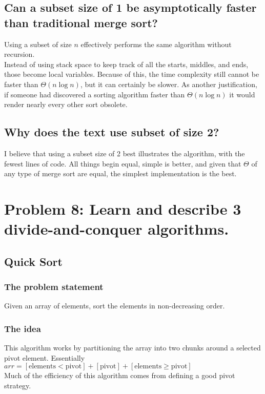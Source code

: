 \documentclass{article}
\begin{document}
    \subsection{Can a subset size of 1 be asymptotically faster than traditional merge sort?}
        Using a subset of size \(n\) effectively performs the same algorithm without recursion. \\
        Instead of using stack space to keep track of all the starts, middles, and ends, those become local variables.
        Because of this, the time complexity still cannot be faster than \(\Theta(n \log n)\), but it can certainly be slower.
        As another justification, if someone had discovered a sorting algorithm faster than \(\Theta(n \log n)\) it would render nearly every other sort obsolete.
    \subsection{Why does the text use subset of size 2?}
        I believe that using a subset size of 2 best illustrates the algorithm, with the fewest lines of code.
        All things begin equal, simple is better, and given that \(\Theta\) of any type of merge sort are equal,
        the simplest implementation is the best.

\section{Problem 8: Learn and describe 3 divide-and-conquer algorithms.}
    \subsection{Quick Sort}
        \subsubsection{The problem statement}
            Given an array of elements, sort the elements in non-decreasing order.
        \subsubsection{The idea}
            This algorithm works by partitioning the array into two chunks around a selected pivot element.
            Essentially \(arr = [\text{elements} < \text{pivot}] + [\text{pivot}] + [\text{elements} \ge \text{pivot}]\) \\
            Much of the efficiency of this algorithm comes from defining a good pivot strategy.
\end{document}
